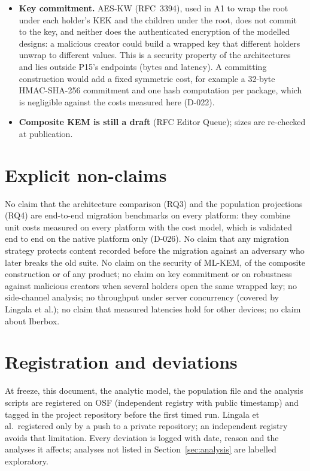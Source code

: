 \documentclass[11pt,a4paper]{article}
\begin{document}
\begin{itemize}
\item \textbf{Key commitment.} AES-KW (RFC~3394), used in A1 to wrap the root under each holder's KEK and the children under the root, does not commit to the key, and neither does the authenticated encryption of the modelled designs: a malicious creator could build a wrapped key that different holders unwrap to different values. This is a security property of the architectures and lies outside P15's endpoints (bytes and latency). A committing construction would add a fixed symmetric cost, for example a 32-byte HMAC-SHA-256 commitment and one hash computation per package, which is negligible against the costs measured here (D-022).
\item \textbf{Composite KEM is still a draft} (RFC Editor Queue); sizes are re-checked at publication.
\end{itemize}

\section{Explicit non-claims}
No claim that the architecture comparison (RQ3) and the population projections (RQ4) are end-to-end migration benchmarks on every platform: they combine unit costs measured on every platform with the cost model, which is validated end to end on the native platform only (D-026). No claim that any migration strategy protects content recorded before the migration against an adversary who later breaks the old suite. No claim on the security of ML-KEM, of the composite construction or of any product; no claim on key commitment or on robustness against malicious creators when several holders open the same wrapped key; no side-channel analysis; no throughput under server concurrency (covered by Lingala et al.); no claim that measured latencies hold for other devices; no claim about Iberbox.

\section{Registration and deviations}\label{sec:registration}
At freeze, this document, the analytic model, the population file and the analysis scripts are registered on OSF (independent registry with public timestamp) and tagged in the project repository before the first timed run. Lingala et al.\ registered only by a push to a private repository; an independent registry avoids that limitation. Every deviation is logged with date, reason and the analyses it affects; analyses not listed in Section~\ref{sec:analysis} are labelled exploratory.
\end{document}
